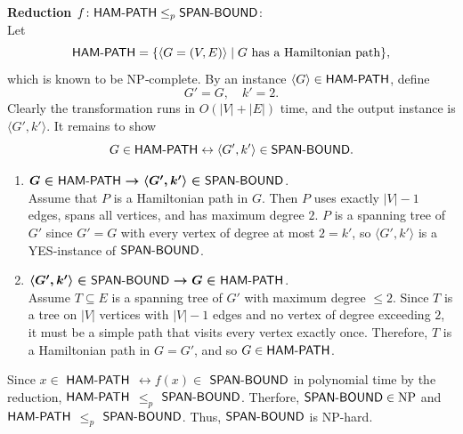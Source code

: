 \begin{enumerate}
\begin{itemize}
\begin{prove}
        \textbf{Reduction \(f\colon \textsf{HAM-PATH}\le_p\textsf{SPAN-BOUND}\)}:\\
        Let 
        \[
            \textsf{HAM-PATH}  = \{\langle G=(V,E)\rangle\mid G\text{ has a Hamiltonian path}\},
        \]
        which is known to be NP‐complete. By an instance \(\langle G\rangle \in \textsf{HAM-PATH}\), define
        \[
            G' = G,
            \quad
            k' = 2.
        \]
        Clearly the transformation runs in \(O(|V|+|E|)\) time, and the output instance is \(\langle G',k'\rangle\).  It remains to show
        \[
            G\in\textsf{HAM-PATH}
             \leftrightarrow 
            \langle G',k'\rangle\in\textsf{SPAN-BOUND}.
        \]
        \begin{enumerate}
            \item \(\boldsymbol{G\in\textsf{HAM-PATH} \rightarrow \langle G',k'\rangle\in\textsf{SPAN-BOUND}}\).\\
            Assume that \(P\) is a Hamiltonian path in \(G\).  Then 
            \(P\) uses exactly \(\lvert V\rvert-1\) edges, spans 
            all vertices, and has maximum degree \(2\). \(P\) 
            is a spanning tree of \(G'\) since \(G'=G\) with every 
            vertex of degree at most \(2=k'\), so \(\langle G',k'\rangle\) 
            is a YES‐instance of \(\textsf{SPAN-BOUND}\).
            \item \(\boldsymbol{\langle G',k'\rangle\in\textsf{SPAN-BOUND} \rightarrow G\in\textsf{HAM-PATH}}\).\\
            Assume \(T\subseteq E\) is a spanning tree of \(G'\) 
            with maximum degree \(\le2\).  Since \(T\) is a tree 
            on \(\lvert V\rvert\) vertices with \(\lvert V\rvert-1\) 
            edges and no vertex of degree exceeding \(2\), it 
            must be a simple path that visits every vertex 
            exactly once. Therefore, \(T\) is a Hamiltonian path 
            in \(G=G'\), and so \(G\in\textsf{HAM-PATH}\).
        \end{enumerate}
        Since $x \in$ $\textsf{HAM-PATH}$ $\leftrightarrow f(x) \in$ $\textsf{SPAN-BOUND}$ 
        in polynomial time by the reduction, 
        $\textsf{HAM-PATH}$ $\leq_p$ $\textsf{SPAN-BOUND}$. 
        Therfore, \(\textsf{SPAN-BOUND}\in\mathrm{NP}\) and 
        $\textsf{HAM-PATH}$ $\leq_p$ $\textsf{SPAN-BOUND}$.
        Thus, $\textsf{SPAN-BOUND}$ is NP-hard.
        \end{prove}
    \end{itemize}














\end{enumerate}
